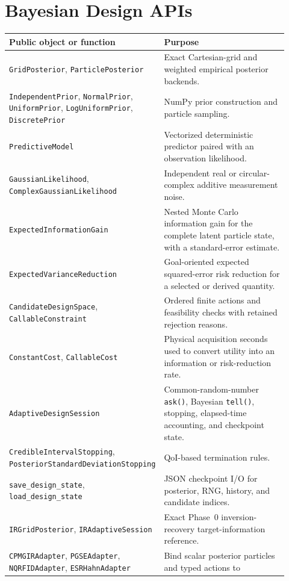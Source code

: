 \documentclass[11pt,oneside]{report}
\newcommand{\code}[1]{\texttt{#1}}
\begin{document}
\section{Bayesian Design APIs}

\begin{longtable}{p{0.35\linewidth}p{0.57\linewidth}}
\toprule
Public object or function & Purpose \\
\midrule
\code{GridPosterior}, \code{ParticlePosterior} & Exact Cartesian-grid and
weighted empirical posterior backends. \\
\code{IndependentPrior}, \code{NormalPrior}, \code{UniformPrior},
\code{LogUniformPrior}, \code{DiscretePrior} & NumPy prior construction and
particle sampling. \\
\code{PredictiveModel} & Vectorized deterministic predictor paired with an
observation likelihood. \\
\code{GaussianLikelihood}, \code{ComplexGaussianLikelihood} & Independent real
or circular-complex additive measurement noise. \\
\code{ExpectedInformationGain} & Nested Monte Carlo information gain for the
complete latent particle state, with a standard-error estimate. \\
\code{ExpectedVarianceReduction} & Goal-oriented expected squared-error risk
reduction for a selected or derived quantity. \\
\code{CandidateDesignSpace}, \code{CallableConstraint} & Ordered finite actions
and feasibility checks with retained rejection reasons. \\
\code{ConstantCost}, \code{CallableCost} & Physical acquisition seconds used
to convert utility into an information or risk-reduction rate. \\
\code{AdaptiveDesignSession} & Common-random-number \code{ask()}, Bayesian
\code{tell()}, stopping, elapsed-time accounting, and checkpoint state. \\
\code{CredibleIntervalStopping},
\code{PosteriorStandardDeviationStopping} & QoI-based termination rules. \\
\code{save\_design\_state}, \code{load\_design\_state} & JSON checkpoint I/O
for posterior, RNG, history, and candidate indices. \\
\code{IRGridPosterior}, \code{IRAdaptiveSession} & Exact Phase~0
inversion-recovery target-information reference. \\
\code{CPMGIRAdapter}, \code{PGSEAdapter}, \code{NQRFIDAdapter},
\code{ESRHahnAdapter} & Bind scalar posterior particles and typed actions to

\end{longtable}
\end{document}
